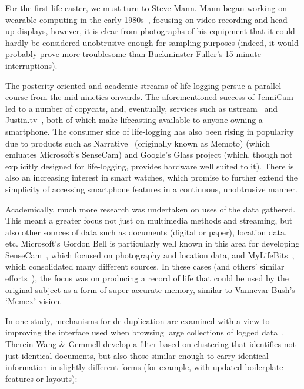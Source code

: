 For the first life-caster, we must turn to Steve Mann.  Mann began working on wearable computing in the early 1980s~\cite{mann1994wearable}, focusing on video recording and head-up-displays, however, it is clear from photographs of his equipment that it could hardly be considered unobtrusive enough for sampling purposes (indeed, it would probably prove more troublesome than Buckminster-Fuller's 15-minute interruptions).

The posterity-oriented and academic streams of life-logging persue a parallel course from the mid nineties onwards.  The aforementioned success of JenniCam led to a number of copycats, and, eventually, services such as ustream~\cite{ustream2014homepage} and Justin.tv~\cite{justintv2014homepage}, both of which make lifecasting available to anyone owning a smartphone.  The consumer side of life-logging has also been rising in popularity due to products such as Narrative~\cite{narrative2014lifelog} (originally known as Memoto) (which emluates Microsoft's SenseCam) and Google's Glass project (which, though not explicitly designed for life-logging, provides hardware well suited to it).  There is also an increasing interest in smart watches, which promise to further extend the simplicity of accessing smartphone features in a continuous, unobtrusive manner.

Academically, much more research was undertaken on uses of the data gathered.  This meant a greater focus not just on multimedia methods and streaming, but also other sources of data such as documents (digital or paper), location data, etc.  Microsoft's Gordon Bell is particularly well known in this area for developing SenseCam~\cite{hodges2006sensecam}, which focused on photography and location data, and MyLifeBits~\cite{gemmell2002mylifebits,gemmell2006mylifebits}, which consolidated many different sources.  In these cases (and others' similar efforts~\cite{huynh2002haystack,dumais2003stuff,dittrich2006imemex}), the focus was on producing a record of life that could be used by the original subject as a form of super-accurate memory, similar to Vannevar Bush's `Memex' vision\cite{bush1945we}.

In one study, mechanisms for de-duplication are examined with a view to improving the interface used when browsing large collections of logged data~\cite{gemmell2006clean}.  Therein Wang \& Gemmell develop a filter based on clustering that identifies not just identical documents, but also those similar enough to carry identical information in slightly different forms (for example, with updated boilerplate features or layouts):

